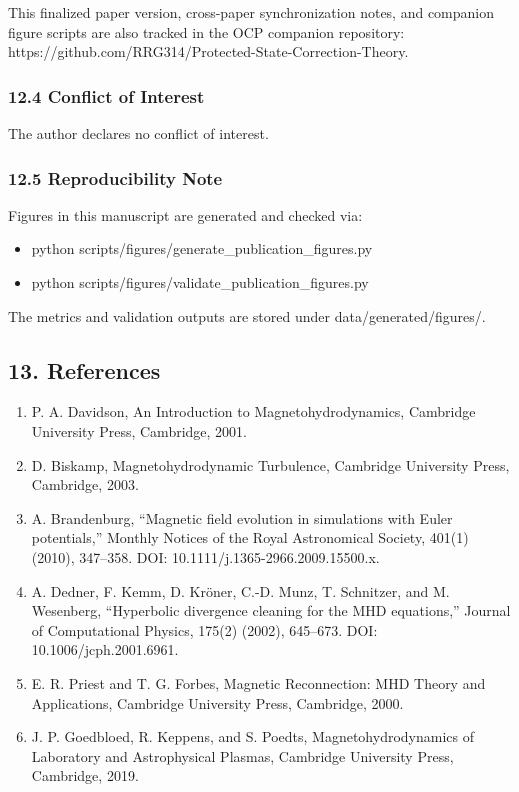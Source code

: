 \documentclass[11pt]{article}
\begin{document}
This finalized paper version, cross-paper synchronization notes, and companion figure scripts are also tracked in the OCP companion repository: https://github.com/RRG314/Protected-State-Correction-Theory.


\subsubsection*{12.4 Conflict of Interest}
The author declares no conflict of interest.


\subsubsection*{12.5 Reproducibility Note}
Figures in this manuscript are generated and checked via:

\begin{itemize}
\item python scripts/figures/generate\_publication\_figures.py
\item python scripts/figures/validate\_publication\_figures.py
\end{itemize}
The metrics and validation outputs are stored under data/generated/figures/.


\subsection*{13. References}
\begin{enumerate}
\item P. A. Davidson, An Introduction to Magnetohydrodynamics, Cambridge University Press, Cambridge, 2001.
\item D. Biskamp, Magnetohydrodynamic Turbulence, Cambridge University Press, Cambridge, 2003.
\item A. Brandenburg, “Magnetic field evolution in simulations with Euler potentials,” Monthly Notices of the Royal Astronomical Society, 401(1) (2010), 347–358. DOI: 10.1111/j.1365-2966.2009.15500.x.
\item A. Dedner, F. Kemm, D. Kröner, C.-D. Munz, T. Schnitzer, and M. Wesenberg, “Hyperbolic divergence cleaning for the MHD equations,” Journal of Computational Physics, 175(2) (2002), 645–673. DOI: 10.1006/jcph.2001.6961.
\item E. R. Priest and T. G. Forbes, Magnetic Reconnection: MHD Theory and Applications, Cambridge University Press, Cambridge, 2000.
\item J. P. Goedbloed, R. Keppens, and S. Poedts, Magnetohydrodynamics of Laboratory and Astrophysical Plasmas, Cambridge University Press, Cambridge, 2019.
\end{enumerate}
\end{document}
